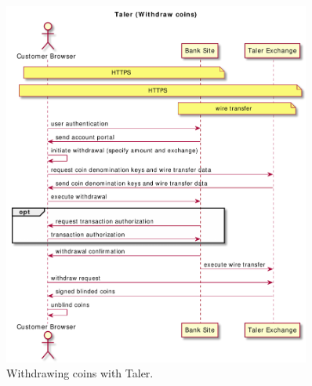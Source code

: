 \documentclass{llncs}
\begin{document}
\begin{figure}[b!]
\includegraphics[width=0.9\textwidth]{figs/taler-withdraw.pdf}
\caption{Withdrawing coins with Taler.}
\label{fig:taler-withdraw}
\end{figure}
\end{document}
